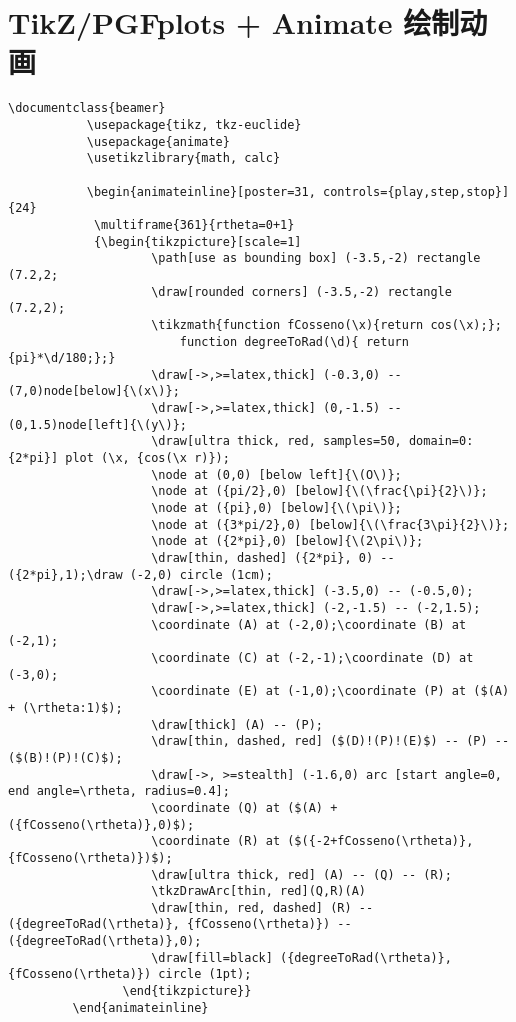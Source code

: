 \section{TikZ/PGFplots + Animate 绘制动画}

\begin{lstlisting}[gobble=8]
           \documentclass{beamer}
           \usepackage{tikz, tkz-euclide}
           \usepackage{animate}
           \usetikzlibrary{math, calc}
           
           \begin{animateinline}[poster=31, controls={play,step,stop}]{24}
            \multiframe{361}{rtheta=0+1}
            {\begin{tikzpicture}[scale=1]
                    \path[use as bounding box] (-3.5,-2) rectangle (7.2,2;
                    \draw[rounded corners] (-3.5,-2) rectangle (7.2,2);
                    \tikzmath{function fCosseno(\x){return cos(\x);};
                        function degreeToRad(\d){ return {pi}*\d/180;};}
                    \draw[->,>=latex,thick] (-0.3,0) -- (7,0)node[below]{\(x\)};
                    \draw[->,>=latex,thick] (0,-1.5) -- (0,1.5)node[left]{\(y\)};
                    \draw[ultra thick, red, samples=50, domain=0:{2*pi}] plot (\x, {cos(\x r)});
                    \node at (0,0) [below left]{\(O\)};
                    \node at ({pi/2},0) [below]{\(\frac{\pi}{2}\)};
                    \node at ({pi},0) [below]{\(\pi\)};
                    \node at ({3*pi/2},0) [below]{\(\frac{3\pi}{2}\)};
                    \node at ({2*pi},0) [below]{\(2\pi\)};
                    \draw[thin, dashed] ({2*pi}, 0) -- ({2*pi},1);\draw (-2,0) circle (1cm);
                    \draw[->,>=latex,thick] (-3.5,0) -- (-0.5,0);
                    \draw[->,>=latex,thick] (-2,-1.5) -- (-2,1.5);
                    \coordinate (A) at (-2,0);\coordinate (B) at (-2,1);
                    \coordinate (C) at (-2,-1);\coordinate (D) at (-3,0);
                    \coordinate (E) at (-1,0);\coordinate (P) at ($(A) + (\rtheta:1)$);
                    \draw[thick] (A) -- (P);
                    \draw[thin, dashed, red] ($(D)!(P)!(E)$) -- (P) -- ($(B)!(P)!(C)$);
                    \draw[->, >=stealth] (-1.6,0) arc [start angle=0, end angle=\rtheta, radius=0.4];
                    \coordinate (Q) at ($(A) + ({fCosseno(\rtheta)},0)$);
                    \coordinate (R) at ($({-2+fCosseno(\rtheta)}, {fCosseno(\rtheta)})$);
                    \draw[ultra thick, red] (A) -- (Q) -- (R);
                    \tkzDrawArc[thin, red](Q,R)(A)
                    \draw[thin, red, dashed] (R) -- ({degreeToRad(\rtheta)}, {fCosseno(\rtheta)}) -- ({degreeToRad(\rtheta)},0);
                    \draw[fill=black] ({degreeToRad(\rtheta)}, {fCosseno(\rtheta)}) circle (1pt);
                \end{tikzpicture}}
         \end{animateinline}
        
\end{lstlisting}


